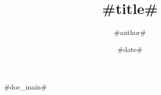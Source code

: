 \documentclass[9pt,xcolor=pst,dvipsnames]{beamer}
\title[#short_title#]
  {#title#}
\subtitle{}
\author[#short_author#]
  {#author#}
\institute[\color{Gray}{DTU Wind Energy}]
  {#institute#}
\date[#short_date#] 
  {#date#}
\begin{document}

#doc_main#
\end{document}
